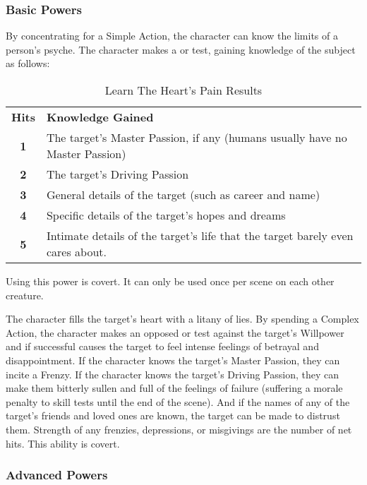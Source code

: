 \subsubsection{Basic Powers}

 By concentrating for a Simple Action, the character can know the limits of a person's psyche. The character makes a  or  test, gaining knowledge of the subject as follows:


\begin{table}[htb]
 \caption{Learn The Heart's Pain Results} \centering
\begin{tabular}{c l}
\textbf{Hits} & \textbf{Knowledge Gained}\\
 \textbf{1} & The target's Master Passion, if any (humans usually have no Master Passion)\\
 \textbf{2} & The target's Driving Passion\\
 \textbf{3} & General details of the target (such as career and name)\\
 \textbf{4} & Specific details of the target's hopes and dreams\\
 \textbf{5} & Intimate details of the target's life that the target barely even cares about.\\
\end{tabular}
\end{table}

Using this power is covert. It can only be used once per scene on each other creature.

 The character fills the target's heart with a litany of lies. By spending a Complex Action, the character makes an opposed  or  test against the target's Willpower and if successful causes the target to feel intense feelings of betrayal and disappointment. If the character knows the target's Master Passion, they can incite a Frenzy. If the character knows the target's Driving Passion, they can make them bitterly sullen and full of the feelings of failure (suffering a morale penalty to skill tests until the end of the scene). And if the names of any of the target's friends and loved ones are known, the target can be made to distrust them. Strength of any frenzies, depressions, or misgivings are the number of net hits. This ability is covert.


\subsubsection{Advanced Powers}

